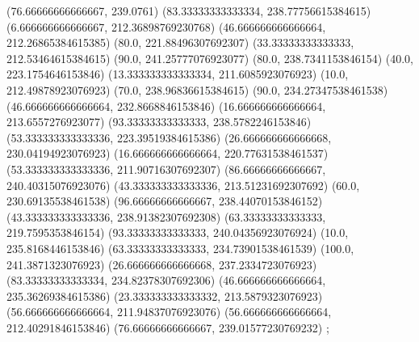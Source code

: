 {{{		(76.66666666666667, 239.0761)
		(83.33333333333334, 238.77756615384615)
		(6.666666666666667, 212.36898769230768)
		(46.666666666666664, 212.26865384615385)
		(80.0, 221.88496307692307)
		(33.33333333333333, 212.53464615384615)
		(90.0, 241.25777076923077)
		(80.0, 238.7341153846154)
		(40.0, 223.1754646153846)
		(13.333333333333334, 211.6085923076923)
		(10.0, 212.49878923076923)
		(70.0, 238.96836615384615)
		(90.0, 234.27347538461538)
		(46.666666666666664, 232.8668846153846)
		(16.666666666666664, 213.6557276923077)
		(93.33333333333333, 238.5782246153846)
		(53.333333333333336, 223.39519384615386)
		(26.666666666666668, 230.04194923076923)
		(16.666666666666664, 220.77631538461537)
		(53.333333333333336, 211.90716307692307)
		(86.66666666666667, 240.40315076923076)
		(43.333333333333336, 213.51231692307692)
		(60.0, 230.69135538461538)
		(96.66666666666667, 238.44070153846152)
		(43.333333333333336, 238.91382307692308)
		(63.33333333333333, 219.7595353846154)
		(93.33333333333333, 240.04356923076924)
		(10.0, 235.8168446153846)
		(63.33333333333333, 234.73901538461539)
		(100.0, 241.3871323076923)
		(26.666666666666668, 237.2334723076923)
		(83.33333333333334, 234.82378307692306)
		(46.666666666666664, 235.36269384615386)
		(23.333333333333332, 213.5879323076923)
		(56.666666666666664, 211.94837076923076)
		(56.666666666666664, 212.40291846153846)
		(76.66666666666667, 239.01577230769232)
	};

}
}
